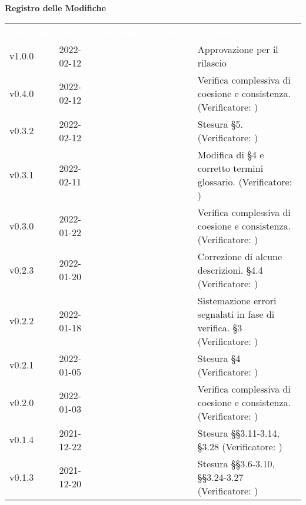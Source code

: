 
{\LARGE{\textbf{Registro delle Modifiche}}} \\
\renewcommand{\arraystretch}{1.5}
\begin{longtable}{ m{}<{\centering}  m{}<{\centering}  m{}<{\centering}  m{}<{\centering}  m{}<{\centering} }
	\rowcolor{darkblue}
	\textcolor{white}{\textbf{Versione}} &\textcolor{white}{\textbf{Data}}& \textcolor{white}{\textbf{Nominativo}} & \textcolor{white}{\textbf{Ruolo}}&\textcolor{white}{\textbf{Descrizione}}\\ 
	v1.0.0& 2022-02-12& \EP{} &  \RE{}  & Approvazione per il rilascio\\

	v0.4.0 & 2022-02-12 & \FP{} & \AN{} & Verifica complessiva di coesione e consistenza. (Verificatore: \textit{\MG})\\

	v0.3.2 & 2022-02-12 & \FP{} & \AN{} & Stesura §5. (Verificatore: \textit{\MG})\\

	v0.3.1 & 2022-02-11 & \GC{} & \AN{} & Modifica di \S{}4 e corretto termini glossario. (Verificatore: \textit{\MG})\\
	
	v0.3.0 & 2022-01-22 & \GC{} & \AN{} & Verifica complessiva di coesione e consistenza. (Verificatore: \textit{\MG})\\		
	
	v0.2.3 & 2022-01-20 & \GC{} & \AN{} & Correzione di alcune descrizioni. \S{}4.4 (Verificatore: \textit{\MG})\\

	v0.2.2 & 2022-01-18 & \GC & \AN & Sistemazione errori segnalati in fase di verifica. \S{}3 (Verificatore: \textit{\PV}) \\

	v0.2.1 & 2022-01-05 & \GC{} & \AN{} & Stesura §4 (Verificatore: \textit{\MG})\\	

	v0.2.0 & 2022-01-03 & \LW{} & \AN{} & Verifica complessiva di coesione e consistenza. (Verificatore: \textit{\PV})\\	

	v0.1.4 & 2021-12-22 & \LW{} & \AN{} & Stesura §§3.11-3.14, §3.28 (Verificatore: \textit{\PV})\\	

	v0.1.3 & 2021-12-20 & \FP{} & \AN{} & Stesura §§3.6-3.10, §§3.24-3.27 (Verificatore: \textit{\PV})\\	
	

\end{longtable}
